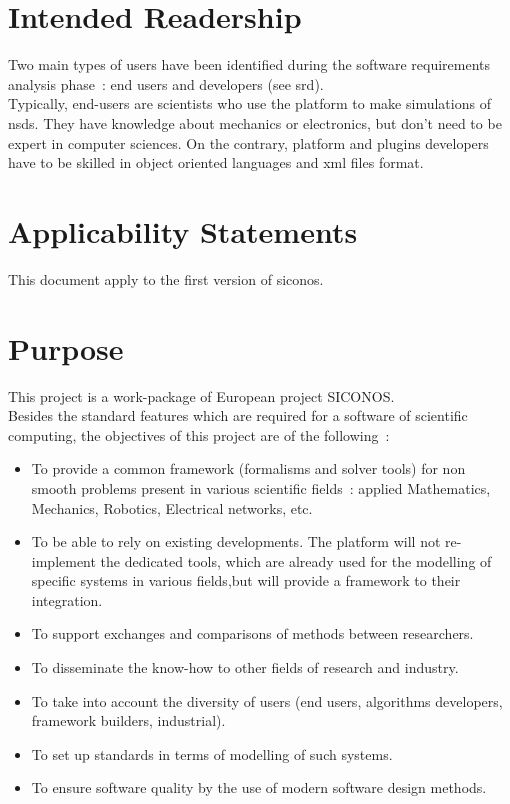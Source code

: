 \section{Intended Readership}
Two main types of users have been identified during the software requirements analysis phase~: end users and developers (see \ac{srd}). \\

Typically, end-users are scientists who use the platform to make simulations of \ac{nsds}. They have knowledge about mechanics or electronics, but don't need to be expert in computer sciences. On the contrary, platform and plugins developers have to be skilled in object oriented languages and \ac{xml} files format.

\section{Applicability Statements}
This document apply to the first version of \ac{siconos}.

\section{Purpose}
This project is a work-package of European project \ac{SICONOS}. \\
Besides the standard features which are required for a software of scientific computing, the objectives of this project are of the following~:
\begin{itemize}
\item To provide a common framework (formalisms and solver tools) for non smooth problems present in various scientific fields~: applied Mathematics, Mechanics, Robotics, Electrical networks, etc. 
\item To be able to rely on existing developments. The platform will not re-implement the dedicated tools, which are already used for the modelling of specific systems in various fields,but will provide a framework to their integration.
\item To support exchanges and comparisons of methods between researchers.
\item To disseminate the know-how to other fields of research and industry.
\item To take into account the diversity of users (end users, algorithms developers, framework builders, industrial).
\item To set up standards in terms of modelling of such systems.
\item To ensure software quality by the use of modern software design methods.
\end{itemize}

